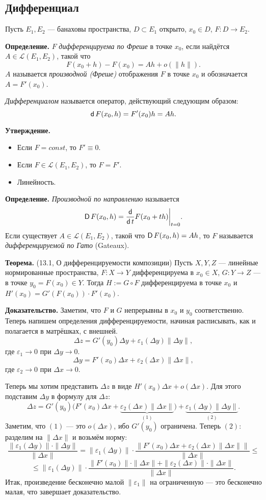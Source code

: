 \subsection{Дифференциал}
Пусть $E_1, E_2$ --- банаховы пространства, $D \subset E_1$ открыто, $x_0 \in D$, $F: D \to E_2$.

\textbf{Определение.} $F$ \textit{дифференцируема по Фреше} в точке $x_0$, если найдётся $A \in \mathcal L(E_1, E_2)$, такой что
\[
    F(x_0 + h) - F(x_0) = Ah + o(\|h\|).
\]
$A$ называется \textit{производной (Фреше)} отображения $F$ в точке $x_0$ и обозначается $A = F'(x_0)$.

\textit{Дифференциалом} называется оператор, действующий следующим образом:
\[
    \operatorname{\mathsf d} F(x_0, h) = F'(x_0) h = Ah.
\]

\textbf{Утверждение.} 
\begin{itemize}
    \item Если $F = const$, то $F' \equiv 0$.
    \item Если $F \in \mathcal L(E_1, E_2)$, то $F = F'$.
    \item Линейность.
\end{itemize}

\textbf{Определение.} \textit{Производной по направлению} называется 
\[
    \operatorname{\mathsf D} F(x_0, h) = \frac{\operatorname{\mathsf d}}{\operatorname{\mathsf d} t} F(x_0 + th)\bigg|_{t = 0}.
\]
Если существует $A \in \mathcal L(E_1, E_2)$, такой что $\operatorname{\mathsf D} F(x_0, h) = Ah$, то $F$ называется \textit{дифференцируемой по Гато} (Gateaux).

\textbf{Теорема.} (13.1, О дифференцируемости композиции) Пусть $X, Y, Z$ --- линейные нормированные пространства, $F: X \to Y$ дифференцируема в $x_0 \in X$, $G: Y \to Z$ --- в точке $y_0 = F(x_0) \in Y$.
Тогда $H := G \circ F$ дифференцируема в точке $x_0$ и $H'(x_0) = G'(F(x_0)) \cdot F'(x_0)$.

\textbf{Доказательство.} Заметим, что $F$ и $G$ непрерывны в $x_0$ и $y_0$ соответственно.
Теперь напишем определения дифференцируемости, начиная расписывать, как и полагается в матрёшках, с внешней.
\[
    \Delta z = G'(y_0) \Delta y + \varepsilon_1(\Delta y) \|\Delta y\|,
\]
где $\varepsilon_1 \to 0$ при $\Delta y \to 0$.
\[
    \Delta y = F'(x_0) \Delta x + \varepsilon_2(\Delta x) \|\Delta x\|,
\]
где $\varepsilon_2 \to 0$ при $\Delta x \to 0$.

Теперь мы хотим представить $\Delta z$ в виде $H'(x_0) \Delta x + o(\Delta x)$.
Для этого подставим $\Delta y$ в формулу для $\Delta z$:
\[
    \Delta z = G'(y_0) \big( F'(x_0) \Delta x + \underbrace{\varepsilon_2(\Delta x) \|\Delta x\|}_{(1)} \big) + \underbrace{\varepsilon_1(\Delta y) \|\Delta y\|}_{(2)}.
\]
Заметим, что $(1)$ --- это $o(\Delta x)$, ибо $G'(y_0)$ ограничена.
Теперь $(2)$: разделим на $\|\Delta x\|$ и возьмём норму:
\[
    \frac{\|\varepsilon_1(\Delta y) \| \cdot \|\Delta y\|}{\|\Delta x\|} = \|\varepsilon_1(\Delta y) \| \cdot \frac{\bigg\|F'(x_0) \Delta x + \varepsilon_2(\Delta x) \|\Delta x\| \bigg\|}{\|\Delta x\|} \le
\]
\[
    \le \|\varepsilon_1(\Delta y) \| \cdot \frac{\|F'(x_0) \| \cdot \|\Delta x\| + \|\varepsilon_2(\Delta x) \| \cdot \|\Delta x\|}{\|\Delta x\|}.
\]
Итак, произведение бесконечно малой $\|\varepsilon_1\|$ на ограниченную --- это бесконечно малая, что завершает доказательство.

